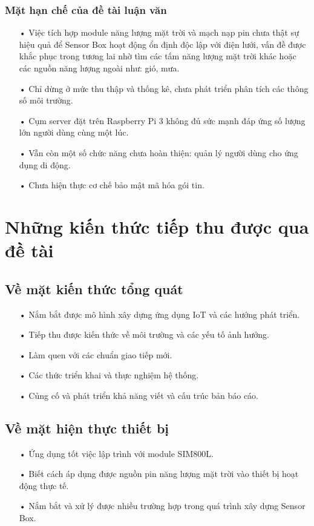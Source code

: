 \subsubsection*{Mặt hạn chế của đề tài luận văn}
\begin{itemize}
\item[•] Việc tích hợp module năng lượng mặt trời và mạch nạp pin chưa thật sự hiệu quả để Sensor Box hoạt động ổn định độc lập với điện lưới, vấn đề được khắc phục trong tương lai nhờ tìm các tấm năng lượng mặt trời khác hoặc các nguồn năng lượng ngoài như: gió, mưa.
\item[•] Chỉ dừng ở mức thu thập và thống kê, chưa phát triển phân tích các thông số môi trường.
\item[•] Cụm server đặt trên Raspberry Pi 3 không đủ sức mạnh đáp ứng số lượng lớn người dùng cùng một lúc.
\item[•] Vẫn còn một số chức năng chưa hoàn thiện: quản lý người dùng cho ứng dụng di động.
\item[•] Chưa hiện thực cơ chế bảo mật mã hóa gói tin.
\end{itemize}


\section{Những kiến thức tiếp thu được qua đề tài}
\subsection{Về mặt kiến thức tổng quát}
\begin{itemize}
	\item[•] Nắm bắt được mô hình xây dựng ứng dụng IoT và các hướng phát triển.
	\item[•] Tiếp thu được kiến thức về môi trường và các yếu tố ảnh hưởng.
	\item[•] Làm quen với các chuẩn giao tiếp mới.
	\item[•] Các thức triển khai và thực nghiệm hệ thống.
	\item[•] Củng cố và phát triển khả năng viết và cấu trúc bản báo cáo. 
\end{itemize}
\subsection{Về mặt hiện thực thiết bị}
\begin{itemize}
	\item[•] Ứng dụng tốt việc lập trình với module SIM800L.
	\item[•] Biết cách áp dụng được nguồn pin năng lượng mặt trời vào thiết bị hoạt động thực tế.
	\item[•] Nắm bắt và xử lý được nhiều trường hợp trong quá trình xây dựng Sensor Box.
\end{itemize}
